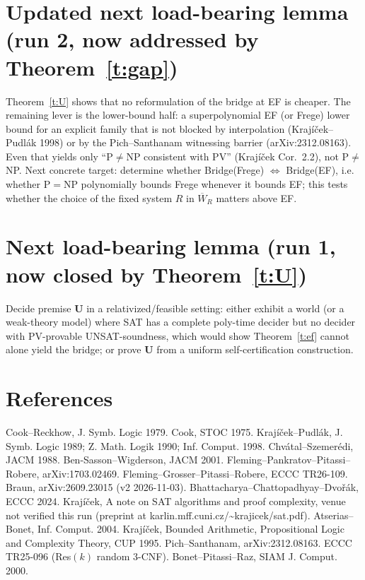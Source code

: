 \documentclass[11pt]{article}
\begin{document}
\section{Updated next load-bearing lemma (run 2, now addressed by Theorem~\ref{t:gap})}
Theorem~\ref{t:U} shows that no reformulation of the bridge at EF is cheaper. The remaining
lever is the lower-bound half: a superpolynomial EF (or Frege) lower bound for an explicit
family that is not blocked by interpolation (Kraj\'i\v{c}ek--Pudl\'ak 1998) or by the
Pich--Santhanam witnessing barrier (arXiv:2312.08163). Even that yields only
``P$\ne$NP consistent with PV'' (Kraj\'i\v{c}ek Cor.~2.2), not P$\ne$NP. Next concrete
target: determine whether Bridge(Frege) $\Leftrightarrow$ Bridge(EF), i.e. whether
P$=$NP polynomially bounds Frege whenever it bounds EF; this tests whether the choice of the
fixed system $R$ in $\overline W_R$ matters above EF.

\section{Next load-bearing lemma (run 1, now closed by Theorem~\ref{t:U})}
Decide premise $\mathbf U$ in a relativized/feasible setting: either exhibit a world (or a
weak-theory model) where SAT has a complete poly-time decider but no decider with
PV-provable UNSAT-soundness, which would show Theorem~\ref{t:ef} cannot alone yield the
bridge; or prove $\mathbf U$ from a uniform self-certification construction.

\section*{References}
Cook--Reckhow, J. Symb. Logic 1979. Cook, STOC 1975. Kraj\'i\v{c}ek--Pudl\'ak, J. Symb. Logic 1989;
Z. Math. Logik 1990; Inf. Comput. 1998. Chv\'atal--Szemer\'edi, JACM 1988. Ben-Sasson--Wigderson,
JACM 2001. Fleming--Pankratov--Pitassi--Robere, arXiv:1703.02469. Fleming--Grosser--Pitassi--Robere,
ECCC TR26-109. Braun, arXiv:2609.23015 (v2 2026-11-03). Bhattacharya--Chattopadhyay--Dvo\v{r}\'ak,
ECCC 2024. Kraj\'i\v{c}ek, A note on SAT algorithms and proof complexity, venue not verified this run (preprint at karlin.mff.cuni.cz/\~{}krajicek/sat.pdf). Atserias--Bonet, Inf. Comput. 2004. Kraj\'i\v{c}ek, Bounded Arithmetic, Propositional Logic and Complexity Theory, CUP 1995. Pich--Santhanam, arXiv:2312.08163. ECCC TR25-096 (Res$(k)$ random 3-CNF). Bonet--Pitassi--Raz, SIAM J. Comput. 2000.
\end{document}
